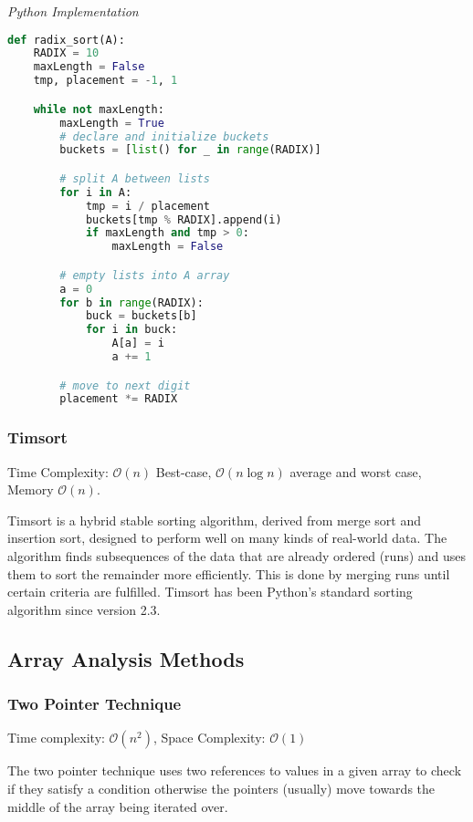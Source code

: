 \documentclass{article}
\newcommand{\bigO}{\ensuremath{\mathcal{O}}}
\begin{document}
\vspace{8pt} \emph{Python Implementation}
\begin{lstlisting}[language=Python]
def radix_sort(A):
    RADIX = 10
    maxLength = False
    tmp, placement = -1, 1

    while not maxLength:
        maxLength = True
        # declare and initialize buckets
        buckets = [list() for _ in range(RADIX)]

        # split A between lists
        for i in A:
            tmp = i / placement
            buckets[tmp % RADIX].append(i)
            if maxLength and tmp > 0:
                maxLength = False

        # empty lists into A array
        a = 0
        for b in range(RADIX):
            buck = buckets[b]
            for i in buck:
                A[a] = i
                a += 1

        # move to next digit
        placement *= RADIX
\end{lstlisting}
    
    \subsubsection{Timsort}
    Time Complexity: $\bigO(n)$ Best-case, $\bigO(n\log n)$  average and worst case, Memory $\bigO(n)$.
    
    Timsort is a hybrid stable sorting algorithm, derived from merge sort and insertion sort, designed to perform well on many kinds of real-world data. The algorithm finds subsequences of the data that are already ordered (runs) and uses them to sort the remainder more efficiently. This is done by merging runs until certain criteria are fulfilled. Timsort has been Python's standard sorting algorithm since version 2.3.
    
    \subsection{Array Analysis Methods}
    
    \subsubsection{Two Pointer Technique}
    Time complexity: $\bigO(n^2)$, Space Complexity: $\bigO(1)$
    
    The two pointer technique uses two references to values in a given array to check if they satisfy a condition otherwise the pointers (usually) move towards the middle of the array being iterated over.
    
\end{document}
